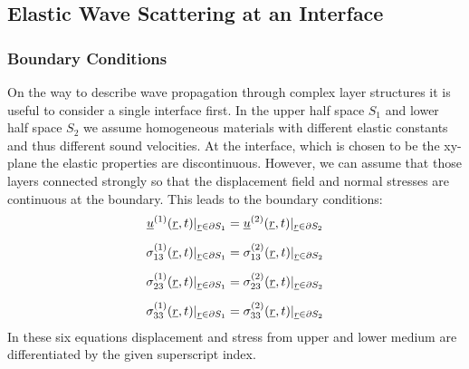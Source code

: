 \subsection{Elastic Wave Scattering at an Interface}

\subsubsection{Boundary Conditions}
On the way to describe wave propagation through complex layer structures it is
useful to consider a single interface first. In the upper half space $S_1$ and
lower half space $S_2$
we assume homogeneous materials with different elastic constants and thus
different sound velocities. At the interface, which is chosen to be the
xy-plane the elastic properties are discontinuous. However, we can assume that
those layers connected strongly so that the displacement field and normal
stresses are continuous at the boundary. This leads to the boundary conditions:
% 
% 
\begin{align} \label{eq:boundaryconditions}
    \underline{u}^{(1)}(\underline{r}, t)|_{\underline{r}\in\partial S_1}   & =
    \underline{u}^{(2)}(\underline{r}, t)|_{\underline{r}\in\partial S_2}       \\[5pt]
    \sigma_{13}^{(1)}(\underline{r}, t)|_{\underline{r}\in\partial S_1} & =
    \sigma_{13}^{(2)}(\underline{r}, t)|_{\underline{r}\in\partial S_2}     \\[5pt]
    \sigma_{23}^{(1)}(\underline{r}, t)|_{\underline{r}\in\partial S_1} & =
    \sigma_{23}^{(2)}(\underline{r}, t)|_{\underline{r}\in\partial S_2}     \\[5pt]
    \sigma_{33}^{(1)}(\underline{r}, t)|_{\underline{r}\in\partial S_1} & =
    \sigma_{33}^{(2)}(\underline{r}, t)|_{\underline{r}\in\partial S_2}
\end{align}
In these six equations displacement and stress from upper and lower medium are
differentiated by the given superscript index.

